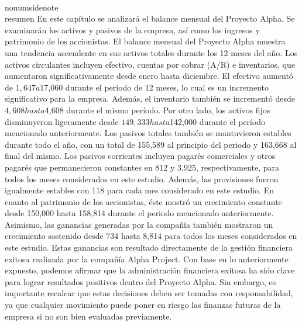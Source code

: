 \\nonumsidenote\\{resumen} En este capítulo se analizará el balance mensual del Proyecto Alpha. Se examinarán los activos y pasivos de la empresa, así como los ingresos y patrimonio de los accionistas.
El balance mensual del Proyecto Alpha muestra una tendencia ascendente en sus activos totales durante los 12 meses del año. Los activos circulantes incluyen efectivo, cuentas por cobrar (A/R) e inventarios, que aumentaron significativamente desde enero hasta diciembre. El efectivo aumentó de $1,647 a $17,060 durante el período de 12 meses, lo cual es un incremento significativo para la empresa. Además, el inventario también se incrementó desde $4,608 hasta $4,608 durante el mismo período. Por otro lado, los activos fijos disminuyeron ligeramente desde $149,333 hasta $142,000 durante el período mencionado anteriormente.
Los pasivos totales también se mantuvieron estables durante todo el año, con un total de 155,589 al principio del periodo y 163,668 al final del mismo. Los pasivos corrientes incluyen pagarés comerciales y otros pagarés que permanecieron constantes en 812 y 3,925, respectivamente, para todos los meses considerados en este estudio. Además, las provisiones fueron igualmente estables con 118 para cada mes considerado en este estudio.
En cuanto al patrimonio de los accionistas, éste mostró un crecimiento constante desde 150,000 hasta 158,814 durante el periodo mencionado anteriormente. Asimismo, las ganancias generadas por la compañía también mostraron un crecimiento sostenido desde 734 hasta 8,814 para todos los meses considerados en este estudio. Estas ganancias son resultado directamente de la gestión financiera exitosa realizada por la compañía Alpha Project.
Con base en lo anteriormente expuesto, podemos afirmar que la administración financiera exitosa ha sido clave para lograr resultados positivos dentro del Proyecto Alpha. Sin embargo, es importante recalcar que estas decisiones deben ser tomadas con responsabilidad, ya que cualquier movimiento puede poner en riesgo las finanzas futuras de la empresa si no son bien evaluadas previamente.
